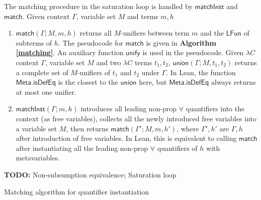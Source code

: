 \noindent The matching procedure in the saturation loop is handled by $\mathsf{matchInst}$ and
$\mathsf{match}$. Given context $\Gamma$, variable set $M$ and terms $m, h$
\begin{enumerate}
  \item $\mathsf{match}(\Gamma; M, m, h)$ returns all $M$-unifiers between term $m$ and the $\mathsf{LFun}$ of subterms of $h$.
    The pseudocode for $\mathsf{match}$ is given in \textbf{Algorithm \ref{matching}}. An auxiliary function
    $\mathsf{unify}$ is used in the pseudocode. Given $\lambda C$ context $\Gamma$, variable set $M$
    and two $\lambda C$ terms $t_1, t_2$, $\mathsf{union}(\Gamma; M, t_1, t_2)$ returns a complete set of
    $M$-unifiers of $t_1$ and $t_2$ under $\Gamma$. In Lean, the function $\mathsf{Meta.isDefEq}$ is the closest
    to the $\mathsf{union}$ here, but $\mathsf{Meta.isDefEq}$ always returns at most one unifier.
  \item $\mathsf{matchInst}(\Gamma; m, h)$ introduces all leading non-prop $\forall$ quantifiers into the context
    (as free variables), collects all the newly introduced free variables into a variable set $M$, then returns
    $\mathsf{match}(\Gamma'; M, m, h')$, where $\Gamma', h'$ are $\Gamma, h$ after introduction of free variables.
    In Lean, this is equivalent to calling $\mathsf{match}$ after instantiating all the leading non-prop
    $\forall$ quantifiers of $h$ with metavariables.
\end{enumerate}

\textbf{TODO:} Non-subsumption equivalence; Saturation loop

\begin{algorithm}\label{matching}
  \DontPrintSemicolon
  \SetNoFillComment
  \caption{Matching algorithm for quantifier instantiation}
\end{algorithm}